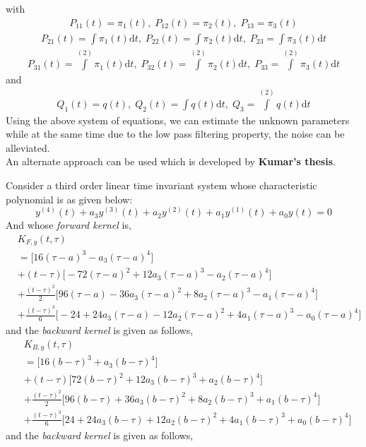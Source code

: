 \documentclass{article}
\begin{document}
with 
\begin{align*}
P_{11}(t) = \pi_{1}(t), \; P_{12}(t) = \pi_{2}(t), \; P_{13} = \pi_{3}(t)
\end{align*}
\begin{align*}
P_{21}(t) = \int \pi_{1}(t) \mathrm{d}t, \; P_{22}(t) = \int \pi_{2}(t) \mathrm{d}t, \; P_{23} = \int \pi_{3}(t) \mathrm{d}t
\end{align*}
\begin{align*}
P_{31}(t) = \int\limits^{(2)} \pi_{1}(t) \mathrm{d}t, \; P_{32}(t) = \int\limits^{(2)} \pi_{2}(t) \mathrm{d}t, \; P_{33} = \int\limits^{(2)} \pi_{3}(t)\mathrm{d}t
\end{align*}
and
\begin{align*}
Q_{1}(t) = q(t), \; Q_{2}(t) = \int q(t) \mathrm{d}t, \; Q_{3} = \int\limits^{(2)} q(t) \mathrm{d}t
\end{align*}
Using the above system of equations, we can estimate the unknown parameters while at the same time due to the low pass filtering property, the noise can be alleviated.\\


An alternate approach can be used which is developed by \textbf{Kumar's thesis}. 


Consider a third order linear time invariant system whose characteristic polynomial is as given below:
\begin{equation}\label{eqn.100}
y^{(4)}(t) + a_{3}y^{(3)}(t) + a_{2}y^{(2)}(t) + a_{1}y^{(1)}(t) + a_{0}y(t) = 0
\end{equation}
And whose \textit{forward kernel} is,
\begin{equation}\label{eqn.101}
\begin{split}
	& K_{F,y}(t,\tau)\\
	&=\bigg[16(\tau-a)^{3}-a_3(\tau-a)^{4}\bigg]\\
	&+(t-\tau)\bigg[-72(\tau-a)^2 + 12a_3(\tau-a)^3 - a_2(\tau-a)^4\bigg]\\
	&+\frac{(t-\tau)^2}{2}\bigg[96(\tau-a) - 36a_3(\tau-a)^2 + 8a_2(\tau-a)^3 -a_1(\tau-a)^4\bigg]\\
	&+\frac{(t-\tau)^3}{6}\bigg[-24 + 24a_3(\tau-a) - 12a_2(\tau-a)^2 + 4a_1(\tau-a)^3 - a_0(\tau-a)^4\bigg]	
\end{split}
\end{equation}
and the \textit{backward kernel} is given as follows,
\begin{equation}\label{eqn.102}
\begin{split}
	&K_{B,y}(t,\tau)\\
	&=\bigg[16(b-\tau)^{3} + a_3(b-\tau)^{4}\bigg]\\
	&+(t-\tau)\bigg[72(b-\tau)^{2} + 12a_3(b-\tau)^{3} + a_2(b-\tau)^{4}\bigg]\\
	&+\frac{(t-\tau)^{2}}{2}\bigg[96(b-\tau)+36a_3(b-\tau)^{2} + 8a_2(b-\tau)^{3} + a_1(b-\tau)^{4}\bigg]\\
	&+\frac{(t-\tau)^{3}}{6}\bigg[24+24a_3(b-\tau)+12a_2(b-\tau)^{2}+4a_1(b-\tau)^{3}+a_0(b-\tau)^{4}\bigg]
\end{split}
\end{equation}
and the \textit{backward kernel} is given as follows,
\end{document}
